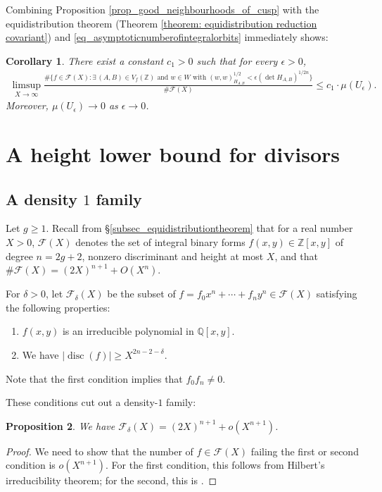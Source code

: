 \documentclass{article} %
\newtheorem{proposition}{Proposition}[section]
\newtheorem{corollary}[proposition]{Corollary}
\numberwithin{equation}{section}
\newcommand{\Q}{\mathbb{Q}}
\newcommand{\Z}{\mathbb{Z}}
\DeclareMathOperator{\disc}{disc}
\begin{document}
Combining Proposition \ref{prop_good_neighbourhoods_of_cusp} with the equidistribution theorem (Theorem \ref{theorem: equidistribution reduction covariant}) and \eqref{eq_asymptoticnumberofintegralorbits} immediately shows:


\begin{corollary}\label{corollary_polyswithsmallnormvectorrare}
    There exist a constant $c_1>0$ such that for every $\epsilon>0$,
    \begin{align}\label{equation: lim sup less than mu(U)}
        \limsup_{X\rightarrow \infty} \frac{\#\{f\in \mathcal{F}(X) \colon \exists\, (A,B)\in V_f(\Z) \text{ and } w\in W \text{ with } ( w,w)_{H_{A,B}}^{1/2} < \epsilon  (\det H_{A,B})^{1/2n} \} }{ \#\mathcal{F}(X)} \leq c_1\cdot \mu(U_{\epsilon}).
    \end{align}
    Moreover, $\mu(U_{\epsilon})\rightarrow 0$ as $\epsilon \rightarrow 0$.
\end{corollary}


\section{A height lower bound for divisors}\label{sec: a height lower bound for divisors}



\subsection{A density $1$ family}

Let $g \geq 1$. Recall from \S\ref{subsec_equidistributiontheorem} that for a real number $X>0$, $\mathcal{F}(X)$ denotes the set of integral binary forms $f(x,y) \in \Z[x,y]$ of degree $n=2g+2$, nonzero discriminant and height at most $X$, and that $\#\mathcal{F}(X) = (2X)^{n+1} +O(X^n)$. 

For $\delta>0$, let $\mathcal{F}_{\delta}(X)$ be the subset of $f = f_0 x^n + \cdots + f_n y^n\in \mathcal{F}(X)$ satisfying the following properties:
\begin{enumerate}
    \item $f(x,y)$ is an irreducible polynomial in $\Q[x,y]$.
    \item We have $|\disc(f)|\geq X^{2n-2-\delta}$. 
\end{enumerate}
Note that the first condition implies that $f_0f_n \neq 0$.

These conditions cut out a density-$1$ family:

\begin{proposition}\label{prop_subfamilyhasdensity1}
    We have $\mathcal{F}_{\delta}(X) = (2X)^{n+1} + o(X^{n+1})$.
\end{proposition}
\begin{proof}
    We need to show that the number of $f\in \mathcal{F}(X)$ failing the first or second condition is $o(X^{n+1})$.
    For the first condition, this follows from Hilbert's irreducibility theorem; for the second, this is \cite[Lemma 6.1]{BSW-squarefreeII}.
\end{proof}
\end{document}
